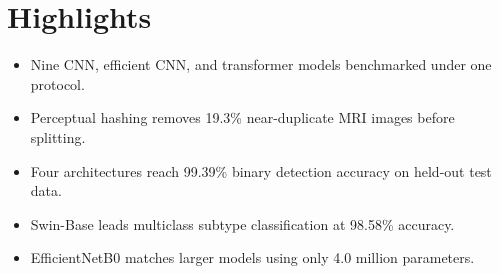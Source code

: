 \documentclass[12pt]{article}
\begin{document}
\section*{Highlights}

\begin{itemize}
\item Nine CNN, efficient CNN, and transformer models benchmarked under one protocol.
\item Perceptual hashing removes 19.3\% near-duplicate MRI images before splitting.
\item Four architectures reach 99.39\% binary detection accuracy on held-out test data.
\item Swin-Base leads multiclass subtype classification at 98.58\% accuracy.
\item EfficientNetB0 matches larger models using only 4.0 million parameters.
\end{itemize}
\end{document}
